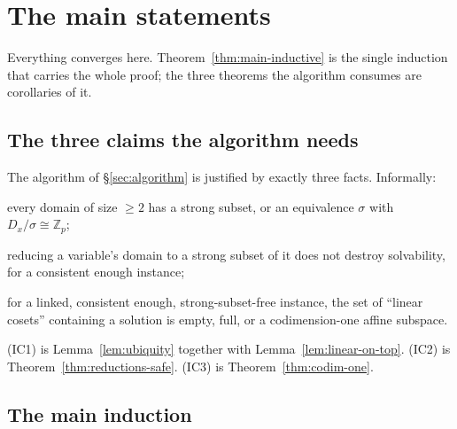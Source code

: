\section{The main statements}\label{sec:main-statements}

Everything converges here.
Theorem~\ref{thm:main-inductive} is the single induction that carries the whole
proof; the three theorems the algorithm consumes are corollaries of it.

\subsection{The three claims the algorithm needs}

The algorithm of \S\ref{sec:algorithm} is justified by exactly three facts.
Informally:

\begin{description}\tightlist
\item[\textup{(IC1)}]\label{ic:existence} every domain of size $\ge 2$ has a
  strong subset, or an equivalence $\sigma$ with
  $D_{x}/\sigma\cong\mathbb Z_{p}$;
\item[\textup{(IC2)}]\label{ic:safe} reducing a variable's domain to a strong
  subset of it does not destroy solvability, for a consistent enough instance;
\item[\textup{(IC3)}]\label{ic:codim} for a linked, consistent enough,
  strong-subset-free instance, the set of ``linear cosets'' containing a
  solution is empty, full, or a codimension-one affine subspace.
\end{description}

(IC1) is Lemma~\ref{lem:ubiquity} together with
Lemma~\ref{lem:linear-on-top}. (IC2) is
Theorem~\ref{thm:reductions-safe}. (IC3) is
Theorem~\ref{thm:codim-one}.

\subsection{The main induction}

